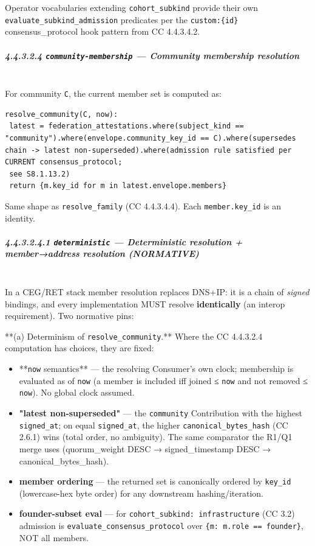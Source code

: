 \documentclass[11pt]{article}
\begin{document}
Operator vocabularies extending \texttt{cohort\_subkind} provide their own \texttt{evaluate\_subkind\_admission} predicates per the \texttt{custom:\{id\}} consensus\_protocol hook pattern from CC 4.4.3.4.2.


\subparagraph{4.4.3.2.4 \texttt{community-membership} — Community membership resolution}\mbox{}\\


For community \texttt{C}, the current member set is computed as:


\begin{lstlisting}
resolve_community(C, now):
 latest = federation_attestations.where(subject_kind == "community").where(envelope.community_key_id == C).where(supersedes chain -> latest non-superseded).where(admission rule satisfied per CURRENT consensus_protocol;
 see S8.1.13.2)
 return {m.key_id for m in latest.envelope.members}
\end{lstlisting}

Same shape as \texttt{resolve\_family} (CC 4.4.3.4.4). Each \texttt{member.key\_id} is an identity.


\subparagraph{4.4.3.2.4.1 \texttt{deterministic} — Deterministic resolution + member→address resolution (NORMATIVE)}\mbox{}\\


In a CEG/RET stack member resolution replaces DNS+IP: it is a chain of \textit{signed} bindings, and every implementation MUST resolve \textbf{identically} (an interop requirement). Two normative pins:


**(a) Determinism of \texttt{resolve\_community}.** Where the CC 4.4.3.2.4 computation has choices, they are fixed:

\begin{itemize}\setlength\itemsep{0pt}
\item **\texttt{now} semantics** — the resolving Consumer's own clock; membership is evaluated as of \texttt{now} (a member is included iff joined ≤ \texttt{now} and not removed ≤ \texttt{now}). No global clock assumed.
\item \textbf{"latest non-superseded"} — the \texttt{community} Contribution with the highest \texttt{signed\_at}; on equal \texttt{signed\_at}, the higher \texttt{canonical\_bytes\_hash} (CC 2.6.1) wins (total order, no ambiguity). The same comparator the R1/Q1 merge uses (quorum\_weight DESC → signed\_timestamp DESC → canonical\_bytes\_hash).
\item \textbf{member ordering} — the returned set is canonically ordered by \texttt{key\_id} (lowercase-hex byte order) for any downstream hashing/iteration.
\item \textbf{founder-subset eval} — for \texttt{cohort\_subkind: infrastructure} (CC 3.2) admission is \texttt{evaluate\_consensus\_protocol} over \texttt{\{m: m.role == founder\}}, NOT all members.
\end{itemize}
\end{document}
